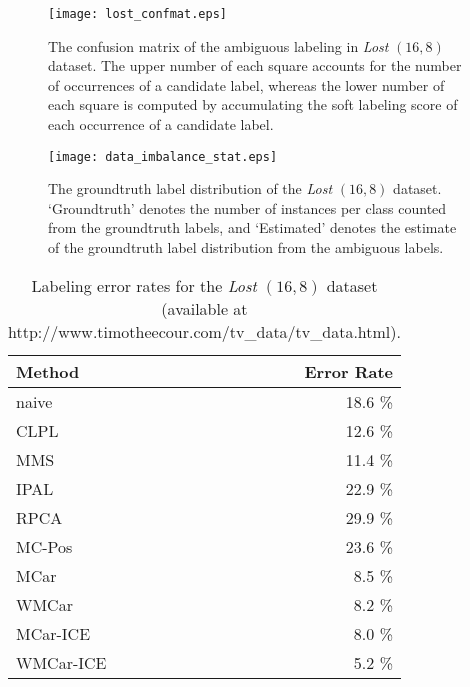 \documentclass[10pt,journal,compsoc]{IEEEtran}
\newcommand{\head}[1]{\textnormal{\textbf{#1}}}
\begin{document}
\begin{figure}
\centering
\texttt{[image: lost\_confmat.eps]}
\caption{The confusion matrix of the ambiguous labeling in \emph{Lost} $(16,8)$ dataset. The upper number of each square accounts for the number of occurrences of a candidate label, whereas the lower number of each square is computed by accumulating the soft labeling score of each occurrence of a candidate label.}\label{fig:label_dist_lost}
\end{figure}



\begin{figure}
\centering
\texttt{[image: data\_imbalance\_stat.eps]}
\caption{The groundtruth label distribution of the \emph{Lost} $(16,8)$ dataset. `Groundtruth' denotes the number of instances per class counted from the groundtruth labels, and  `Estimated' denotes the estimate of the groundtruth label distribution from the ambiguous labels.}\label{fig:data_imbalance_stat}
\end{figure}







\begin{table}
\begin{center}
\begin{tabular}{lr}
  \toprule[1.0pt]
  \head{Method\quad\quad\quad\quad\quad\quad\quad\quad\quad}  & \head{Error Rate}\\
  \midrule
  naive  & 18.6 \%\\
  CLPL  \cite{Cour2011}  & 12.6 \%\\
  MMS \cite{Luo2010}  & 11.4 \%\\
  IPAL \cite{Zhang2015stp}  & 22.9 \%\\
  \midrule
  RPCA \cite{Lin2009}  & 29.9 \% \\
  MC-Pos \cite{Cabral2014}  & 23.6 \% \\
  \midrule
  MCar   & 8.5 \%\\
  WMCar   & 8.2 \%\\
  MCar-ICE   & 8.0 \%\\
  WMCar-ICE   & 5.2 \% \\
  \bottomrule[1.0pt]
\end{tabular}
\end{center}
\caption{Labeling error rates for the \emph{Lost} $(16,8)$ dataset (available at http://www.timotheecour.com/tv\_data/tv\_data.html).}
\label{tab:lostcomp}
\end{table}
\end{document}
